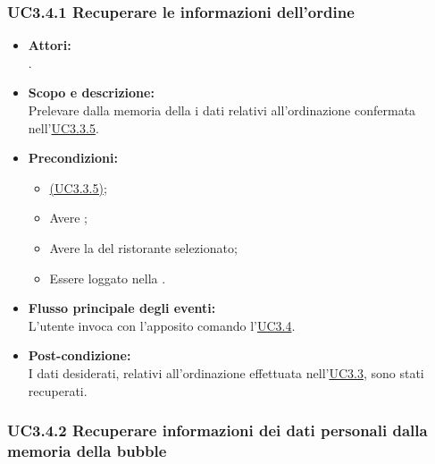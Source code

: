 \subsubsection{UC3.4.1 Recuperare le informazioni dell'ordine} \label{UC3.4.1}

\begin{itemize}
	\item \textbf{Attori:}
	\\.
	\item \textbf{Scopo e descrizione:} 
	\\Prelevare dalla memoria della  i dati relativi all'ordinazione confermata nell'\hyperref[UC3.3.5]{UC3.3.5}.
	\item \textbf{Precondizioni:}
	\begin{itemize}
		\item \hyperref[UC3.3.5]{(UC3.3.5)};
		\item Avere ;
		\item Avere la  del ristorante selezionato;
		\item Essere loggato nella .
	\end{itemize}
	\item \textbf{Flusso principale degli eventi:}
	\\L'utente invoca con l'apposito comando l'\hyperref[UC3.4]{UC3.4}.
	\item \textbf{Post-condizione:}
	\\I dati desiderati, relativi all'ordinazione effettuata nell'\hyperref[UC3.3]{UC3.3}, sono stati recuperati. 
\end{itemize}

\subsubsection{UC3.4.2 Recuperare informazioni dei dati personali dalla memoria della bubble} \label{UC3.4.2}

